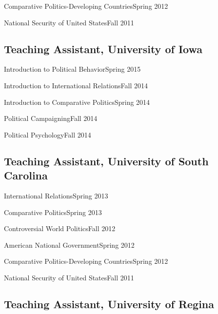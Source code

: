 \documentclass[10.5pt,]{article}
\providecommand{\tightlist}{%
  \setlength{\itemsep}{0pt}\setlength{\parskip}{0pt}}
\renewenvironment{itemize}{
  \begin{list}{}{
    \setlength{\leftmargin}{1.5em}
  }
}{
  \end{list}
}
\begin{document}
\begin{itemize}
\tightlist
\item
  Comparative Politics-Developing Countries\hfill Spring 2012
\item
  National Security of United States\hfill Fall 2011
\end{itemize}

\subsection{Teaching Assistant, University of
Iowa}\label{teaching-assistant-university-of-iowa}

\begin{itemize}
\tightlist
\item
  Introduction to Political Behavior\hfill Spring 2015
\item
  Introduction to International Relations\hfill Fall 2014
\item
  Introduction to Comparative Politics\hfill Spring 2014
\item
  Political Campaigning\hfill Fall 2014
\item
  Political Psychology\hfill Fall 2014
\end{itemize}

\subsection{Teaching Assistant, University of South
Carolina}\label{teaching-assistant-university-of-south-carolina}

\begin{itemize}
\tightlist
\item
  International Relations\hfill Spring 2013
\item
  Comparative Politics\hfill Spring 2013
\item
  Controversial World Politics\hfill Fall 2012
\item
  American National Government\hfill Spring 2012
\item
  Comparative Politics-Developing Countries\hfill Spring 2012
\item
  National Security of United States\hfill Fall 2011
\end{itemize}

\subsection{Teaching Assistant, University of
Regina}\label{teaching-assistant-university-of-regina}
\end{document}
